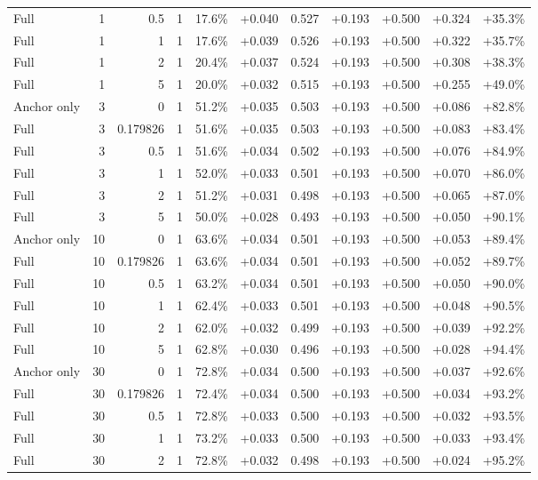 \begin{table}[htbp]
\begin{tabular}{lrrrccccccc}
Full & 1 & 0.5 & 1 & 17.6\% & +0.040 & 0.527 & +0.193 & +0.500 & +0.324 & +35.3\% \\
Full & 1 & 1 & 1 & 17.6\% & +0.039 & 0.526 & +0.193 & +0.500 & +0.322 & +35.7\% \\
Full & 1 & 2 & 1 & 20.4\% & +0.037 & 0.524 & +0.193 & +0.500 & +0.308 & +38.3\% \\
Full & 1 & 5 & 1 & 20.0\% & +0.032 & 0.515 & +0.193 & +0.500 & +0.255 & +49.0\% \\
Anchor only & 3 & 0 & 1 & 51.2\% & +0.035 & 0.503 & +0.193 & +0.500 & +0.086 & +82.8\% \\
Full & 3 & 0.179826 & 1 & 51.6\% & +0.035 & 0.503 & +0.193 & +0.500 & +0.083 & +83.4\% \\
Full & 3 & 0.5 & 1 & 51.6\% & +0.034 & 0.502 & +0.193 & +0.500 & +0.076 & +84.9\% \\
Full & 3 & 1 & 1 & 52.0\% & +0.033 & 0.501 & +0.193 & +0.500 & +0.070 & +86.0\% \\
Full & 3 & 2 & 1 & 51.2\% & +0.031 & 0.498 & +0.193 & +0.500 & +0.065 & +87.0\% \\
Full & 3 & 5 & 1 & 50.0\% & +0.028 & 0.493 & +0.193 & +0.500 & +0.050 & +90.1\% \\
Anchor only & 10 & 0 & 1 & 63.6\% & +0.034 & 0.501 & +0.193 & +0.500 & +0.053 & +89.4\% \\
Full & 10 & 0.179826 & 1 & 63.6\% & +0.034 & 0.501 & +0.193 & +0.500 & +0.052 & +89.7\% \\
Full & 10 & 0.5 & 1 & 63.2\% & +0.034 & 0.501 & +0.193 & +0.500 & +0.050 & +90.0\% \\
Full & 10 & 1 & 1 & 62.4\% & +0.033 & 0.501 & +0.193 & +0.500 & +0.048 & +90.5\% \\
Full & 10 & 2 & 1 & 62.0\% & +0.032 & 0.499 & +0.193 & +0.500 & +0.039 & +92.2\% \\
Full & 10 & 5 & 1 & 62.8\% & +0.030 & 0.496 & +0.193 & +0.500 & +0.028 & +94.4\% \\
Anchor only & 30 & 0 & 1 & 72.8\% & +0.034 & 0.500 & +0.193 & +0.500 & +0.037 & +92.6\% \\
Full & 30 & 0.179826 & 1 & 72.4\% & +0.034 & 0.500 & +0.193 & +0.500 & +0.034 & +93.2\% \\
Full & 30 & 0.5 & 1 & 72.8\% & +0.033 & 0.500 & +0.193 & +0.500 & +0.032 & +93.5\% \\
Full & 30 & 1 & 1 & 73.2\% & +0.033 & 0.500 & +0.193 & +0.500 & +0.033 & +93.4\% \\
Full & 30 & 2 & 1 & 72.8\% & +0.032 & 0.498 & +0.193 & +0.500 & +0.024 & +95.2\% \\

\end{tabular}
\end{table}
